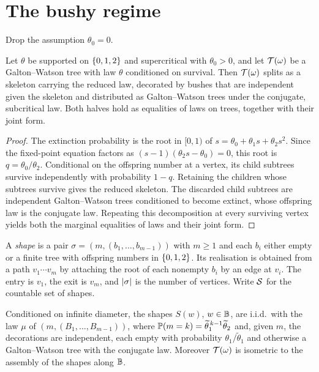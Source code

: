 \section{The bushy regime}

Drop the assumption $\theta_0=0$.

\begin{proposition}
\label{thm:harris}
\leanok
{}
Let $\theta$ be supported on $\{0,1,2\}$ and supercritical with $\theta_0>0$, and let
$\mathcal{T}(\omega)$ be a Galton--Watson tree with law $\theta$ conditioned on survival. Then
$\mathcal{T}(\omega)$ splits as a skeleton carrying the reduced law, decorated by bushes that are
independent given the skeleton and distributed as Galton--Watson trees under the conjugate,
subcritical law. Both halves hold as equalities of laws on trees, together with their joint
form.
\end{proposition}

\begin{proof}
\leanok
The extinction probability is the root in $[0,1)$ of
$s=\theta_0+\theta_1s+\theta_2s^2$. Since the fixed-point equation factors as
$(s-1)(\theta_2s-\theta_0)=0$, this root is $q=\theta_0/\theta_2$. Conditional on the
offspring number at a vertex, its child subtrees survive independently with probability $1-q$.
Retaining the children whose subtrees survive gives the reduced skeleton. The discarded child
subtrees are independent Galton--Watson trees conditioned to become extinct, whose offspring law
is the conjugate law. Repeating this decomposition at every surviving vertex yields both the
marginal equalities of laws and their joint form.
\end{proof}

\begin{definition}[Shapes]
\label{def:shape}
\leanok
{}
A \emph{shape} is a pair $\sigma=(m,(b_1,\dots,b_{m-1}))$ with $m\geq1$ and each $b_i$ either
empty or a finite tree with offspring numbers in $\{0,1,2\}$. Its realisation is obtained
from a path $v_1\cdots v_m$ by attaching the root of each nonempty $b_i$ by an edge at $v_i$.
The entry is $v_1$, the exit is $v_m$, and $\lvert \sigma \rvert$ is the number of vertices. Write $\mathcal{S}$
for the countable set of shapes.
\end{definition}

\begin{proposition}
\label{thm:shape-iid}
\leanok
{}
Conditioned on infinite diameter, the shapes $S(w)$, $w\in\mathbb{B}$, are i.i.d.\ with the law
$\mu$ of $(m,(B_1,\dots,B_{m-1}))$, where $\mathbb{P}(m=k)=\widetilde\theta_1^{\,k-1}
\widetilde\theta_2$ and, given $m$, the decorations are independent, each empty with
probability $\theta_1/\widetilde\theta_1$ and otherwise a Galton--Watson tree with the
conjugate law. Moreover $\mathcal{T}(\omega)$ is isometric to the assembly of the shapes along
$\mathbb{B}$.
\end{proposition}

